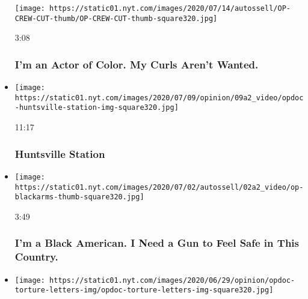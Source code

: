 \begin{itemize}
  \texttt{[image: https://static01.nyt.com/images/2020/07/14/autossell/OP-CREW-CUT-thumb/OP-CREW-CUT-thumb-square320.jpg]}

  3:08

  \hypertarget{im-an-actor-of-color-my-curls-arent-wanted}{%
  \subsubsection{I'm an Actor of Color. My Curls Aren't
  Wanted.}\label{im-an-actor-of-color-my-curls-arent-wanted}}
\item
  \href{https://www.nytimes.com/video/opinion/100000007080462/huntsville-station.html?action=click\&module=video-series-bar\&region=header\&pgtype=Article\&playlistId=video/opinion}{}

  \texttt{[image: https://static01.nyt.com/images/2020/07/09/opinion/09a2\_video/opdoc-huntsville-station-img-square320.jpg]}

  11:17

  \hypertarget{huntsville-station}{%
  \subsubsection{Huntsville Station}\label{huntsville-station}}
\item
  \href{https://www.nytimes.com/video/embedded/opinion/100000007209565/black-gun-ownership.html?action=click\&module=video-series-bar\&region=header\&pgtype=Article\&playlistId=video/opinion}{}

  \texttt{[image: https://static01.nyt.com/images/2020/07/02/autossell/02a2\_video/op-blackarms-thumb-square320.jpg]}

  3:49

  \hypertarget{im-a-black-american-i-need-a-gun-to-feel-safe-in-this-country}{%
  \subsubsection{I'm a Black American. I Need a Gun to Feel Safe in This
  Country.}\label{im-a-black-american-i-need-a-gun-to-feel-safe-in-this-country}}
\item
  \href{https://www.nytimes.com/video/opinion/100000007205588/the-torture-letters.html?action=click\&module=video-series-bar\&region=header\&pgtype=Article\&playlistId=video/opinion}{}

  \texttt{[image: https://static01.nyt.com/images/2020/06/29/opinion/opdoc-torture-letters-img/opdoc-torture-letters-img-square320.jpg]}


\end{itemize}
